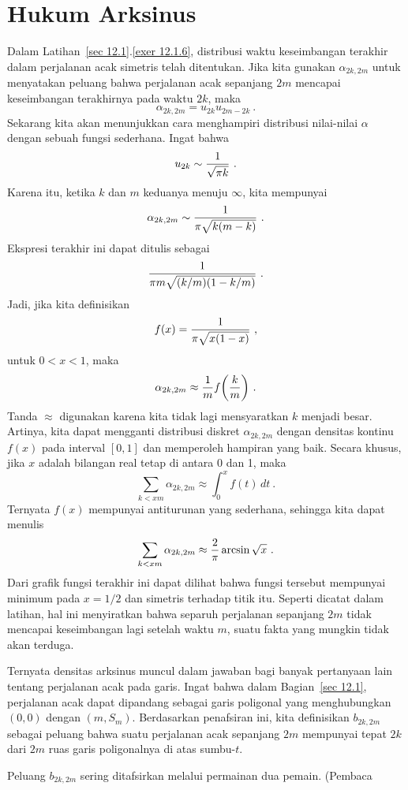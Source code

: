 \section{Hukum Arksinus}\label{sec 12.3}
\par
Dalam Latihan~\ref{sec 12.1}.\ref{exer 12.1.6}, distribusi waktu keseimbangan
terakhir dalam perjalanan acak simetris telah ditentukan. Jika kita gunakan
$\alpha_{2k, 2m}$ untuk menyatakan peluang bahwa perjalanan acak sepanjang
$2m$ mencapai keseimbangan terakhirnya pada waktu $2k$, maka
$$\alpha_{2k, 2m} = u_{2k}u_{2m-2k}\ .$$
Sekarang kita akan menunjukkan cara menghampiri distribusi nilai-nilai $\alpha$
dengan sebuah fungsi sederhana. Ingat bahwa
$$u_{2k} \sim {1\over{\sqrt {\pi k}}}\ .$$
Karena itu, ketika $k$ dan $m$ keduanya menuju $\infty$, kita mempunyai
$$\alpha_{2k, 2m} \sim {1\over{\pi \sqrt{k(m-k)}}}\ .$$
Ekspresi terakhir ini dapat ditulis sebagai
$${1\over{\pi m \sqrt{(k/m)(1 - k/m)}}}\ .$$
Jadi, jika kita definisikan
$$f(x) = {1\over{\pi \sqrt{x(1-x)}}}\ ,$$
untuk $0 < x < 1$, maka
$$\alpha_{2k, 2m} \approx {1\over m}f\biggl({k\over m}\biggr)\ .$$
Tanda $\approx$ digunakan karena kita tidak lagi mensyaratkan $k$ menjadi
besar. Artinya, kita dapat mengganti distribusi diskret $\alpha_{2k, 2m}$
dengan densitas kontinu $f(x)$ pada interval $[0, 1]$ dan memperoleh hampiran
yang baik. Secara khusus, jika $x$ adalah bilangan real tetap di antara 0 dan
1, maka
$$\sum_{k < xm}\alpha_{2k, 2m} \approx \int_0^x f(t)\,dt\ .$$
Ternyata $f(x)$ mempunyai antiturunan yang sederhana, sehingga kita dapat
menulis
$$\sum_{k < xm}\alpha_{2k, 2m} \approx {2\over \pi}\arcsin \sqrt x\ .$$  
Dari grafik fungsi terakhir ini dapat dilihat bahwa fungsi tersebut mempunyai
minimum pada $x = 1/2$ dan simetris terhadap titik itu. Seperti dicatat dalam
latihan, hal ini menyiratkan bahwa separuh perjalanan sepanjang $2m$ tidak
mencapai keseimbangan lagi setelah waktu $m$, suatu fakta yang mungkin tidak
akan terduga.
\par
Ternyata densitas arksinus muncul dalam jawaban bagi banyak pertanyaan lain
tentang perjalanan acak pada garis. Ingat bahwa dalam Bagian~\ref{sec 12.1},
perjalanan acak dapat dipandang sebagai garis poligonal yang menghubungkan
$(0,0)$ dengan $(m, S_m)$. Berdasarkan penafsiran ini, kita definisikan
$b_{2k, 2m}$ sebagai peluang bahwa suatu perjalanan acak sepanjang $2m$
mempunyai tepat $2k$ dari $2m$ ruas garis poligonalnya di atas sumbu-$t$.
\par
Peluang $b_{2k, 2m}$ sering ditafsirkan melalui permainan dua pemain. (Pembaca
